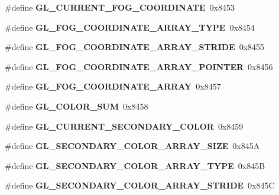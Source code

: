 \begin{DoxyCompactItemize}
\item 
\#define {\bfseries G\+L\+\_\+\+C\+U\+R\+R\+E\+N\+T\+\_\+\+F\+O\+G\+\_\+\+C\+O\+O\+R\+D\+I\+N\+A\+T\+E}~0x8453\label{_s_d_l__opengl_8h_ac484320c34676d56821edb530042524a}

\item 
\#define {\bfseries G\+L\+\_\+\+F\+O\+G\+\_\+\+C\+O\+O\+R\+D\+I\+N\+A\+T\+E\+\_\+\+A\+R\+R\+A\+Y\+\_\+\+T\+Y\+P\+E}~0x8454\label{_s_d_l__opengl_8h_aa6440b6edfac2ad68e3fde151ccb8813}

\item 
\#define {\bfseries G\+L\+\_\+\+F\+O\+G\+\_\+\+C\+O\+O\+R\+D\+I\+N\+A\+T\+E\+\_\+\+A\+R\+R\+A\+Y\+\_\+\+S\+T\+R\+I\+D\+E}~0x8455\label{_s_d_l__opengl_8h_ae130784bc3a0b50a7cd3b20aaf0d1b5b}

\item 
\#define {\bfseries G\+L\+\_\+\+F\+O\+G\+\_\+\+C\+O\+O\+R\+D\+I\+N\+A\+T\+E\+\_\+\+A\+R\+R\+A\+Y\+\_\+\+P\+O\+I\+N\+T\+E\+R}~0x8456\label{_s_d_l__opengl_8h_ad2cfb69cc6d52e42b361659cc793e94d}

\item 
\#define {\bfseries G\+L\+\_\+\+F\+O\+G\+\_\+\+C\+O\+O\+R\+D\+I\+N\+A\+T\+E\+\_\+\+A\+R\+R\+A\+Y}~0x8457\label{_s_d_l__opengl_8h_a4bfc7f76d272eda015e225e0b29555ed}

\item 
\#define {\bfseries G\+L\+\_\+\+C\+O\+L\+O\+R\+\_\+\+S\+U\+M}~0x8458\label{_s_d_l__opengl_8h_ad128c4352d240ad0dbdd574fbf5c00a5}

\item 
\#define {\bfseries G\+L\+\_\+\+C\+U\+R\+R\+E\+N\+T\+\_\+\+S\+E\+C\+O\+N\+D\+A\+R\+Y\+\_\+\+C\+O\+L\+O\+R}~0x8459\label{_s_d_l__opengl_8h_a498903538395b6ff653e63d57d1a615c}

\item 
\#define {\bfseries G\+L\+\_\+\+S\+E\+C\+O\+N\+D\+A\+R\+Y\+\_\+\+C\+O\+L\+O\+R\+\_\+\+A\+R\+R\+A\+Y\+\_\+\+S\+I\+Z\+E}~0x845\+A\label{_s_d_l__opengl_8h_accbcd313b5484e96c78edf37b67b0498}

\item 
\#define {\bfseries G\+L\+\_\+\+S\+E\+C\+O\+N\+D\+A\+R\+Y\+\_\+\+C\+O\+L\+O\+R\+\_\+\+A\+R\+R\+A\+Y\+\_\+\+T\+Y\+P\+E}~0x845\+B\label{_s_d_l__opengl_8h_aa1affab18bb7c6679745f2e3bb10ad3a}

\item 
\#define {\bfseries G\+L\+\_\+\+S\+E\+C\+O\+N\+D\+A\+R\+Y\+\_\+\+C\+O\+L\+O\+R\+\_\+\+A\+R\+R\+A\+Y\+\_\+\+S\+T\+R\+I\+D\+E}~0x845\+C\label{_s_d_l__opengl_8h_a6de5c3369b29b78b9e817e130c4e13a3}


\end{DoxyCompactItemize}
